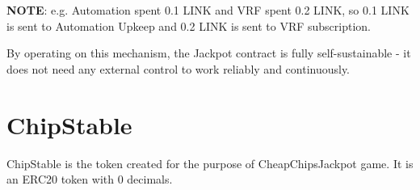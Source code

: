 \documentclass[12pt]{article}
\begin{document}
\textbf{NOTE}: e.g. Automation spent 0.1 LINK and VRF spent 0.2 LINK, so 0.1 LINK is sent to Automation Upkeep and 0.2 LINK is sent to VRF subscription.

\hfill

By operating on this mechanism, the Jackpot contract is fully self-sustainable - it does not need any external control to work reliably and continuously. 

\section{ChipStable}
ChipStable is the token created for the purpose of CheapChipsJackpot game. It is an ERC20\cite{erc20} token with 0 decimals.

\newpage
\printbibliography
\end{document}
